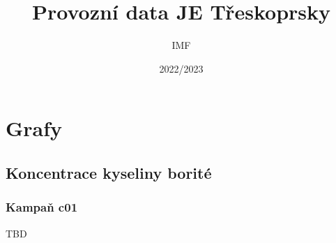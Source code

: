 \documentclass[a4paper,twoside,11pt]{article}
\title{Provozní data JE Třeskoprsky}
\author{IMF}
\date{2022/2023}
\begin{document}
\maketitle
\tableofcontents

\section{Grafy}

\subsection{Koncentrace kyseliny borité}

\subsubsection{Kampaň c01}

TBD
\end{document}
